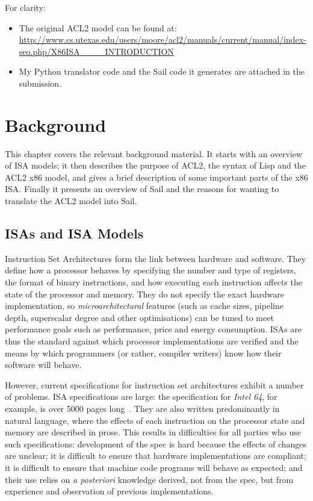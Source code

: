 \documentclass[a4paper,12pt,twoside,openright]{report}
\begin{document}
For clarity:

\begin{itemize}
  \item The original ACL2 model can be found at: \url{http://www.cs.utexas.edu/users/moore/acl2/manuals/current/manual/index-seo.php/X86ISA____INTRODUCTION}
  \item My Python translator code and the Sail code it generates are attached in the submission.
\end{itemize}


\hypertarget{chapter-background}{
\chapter{Background}\label{chapter-background}}

This chapter covers the relevant background material.  It starts with an overview of ISA models; it then describes the purpose of ACL2, the syntax of Lisp and the ACL2 x86 model, and gives a brief description of some important parts of the x86 ISA.  Finally it presents an overview of Sail and the reasons for wanting to translate the ACL2 model into Sail.

\section{ISAs and ISA Models}

Instruction Set Architectures form the link between hardware and software.  They define how a processor behaves by specifying the number and type of registers, the format of binary instructions, and how executing each instruction affects the state of the processor and memory.  They do not specify the exact hardware implementation, so \emph{microarchitectural} features (such as cache sizes, pipeline depth, superscalar degree and other optimisations) can be tuned to meet performance goals such as performance, price and energy consumption.  ISAs are thus the standard against which processor implementations are verified and the means by which programmers (or rather, compiler writers) know how their software will behave.

However, current specifications for instruction set architectures exhibit a number of problems.  ISA specifications are large: the specification for \emph{Intel 64}, for example, is over 5000 pages long~\cite{background-intel-manual}.  They are also written predominantly in natural language, where the effects of each instruction on the processor state and memory are described in prose.  This results in difficulties for all parties who use such specifications: development of the spec is hard because the effects of changes are unclear; it is difficult to ensure that hardware implementations are compliant; it is difficult to ensure that machine code programs will behave as expected; and their use relies on \emph{a posteriori} knowledge derived, not from the spec, but from experience and observation of previous implementations.
\end{document}
